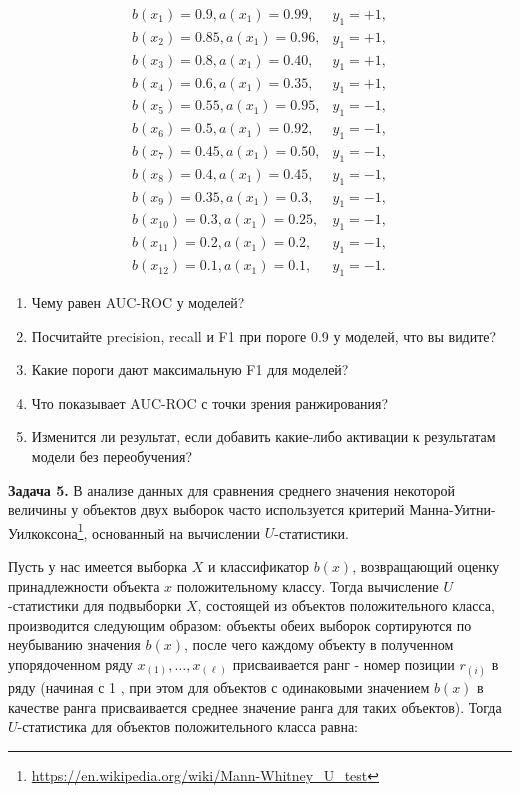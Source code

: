 \documentclass[12pt,fleqn]{article}
\begin{document}
$$
\begin{array}{lc}
b\left(x_{1}\right)=0.9, a\left(x_{1}\right)=0.99, & y_{1}=+1, \\
b\left(x_{2}\right)=0.85, a\left(x_{1}\right)=0.96, & y_{1}=+1, \\
b\left(x_{3}\right)=0.8, a\left(x_{1}\right)=0.40, & y_{1}=+1, \\b\left(x_{4}\right)=0.6, a\left(x_{1}\right)=0.35, & y_{1}=+1, \\b\left(x_{5}\right)=0.55, a\left(x_{1}\right)=0.95, & y_{1}=-1, \\
b\left(x_{6}\right)=0.5, a\left(x_{1}\right)=0.92, & y_{1}=-1, \\
b\left(x_{7}\right)=0.45, a\left(x_{1}\right)=0.50, & y_{1}=-1, \\b\left(x_{8}\right)=0.4, a\left(x_{1}\right)=0.45, & y_{1}=-1, \\
b\left(x_{9}\right)=0.35, a\left(x_{1}\right)=0.3, & y_{1}=-1, \\
b\left(x_{10}\right)=0.3, a\left(x_{1}\right)=0.25, & y_{1}=-1, \\
b\left(x_{11}\right)=0.2, a\left(x_{1}\right)=0.2, & y_{1}=-1, \\
b\left(x_{12}\right)=0.1, a\left(x_{1}\right)=0.1, & y_{1}=-1.
\end{array}
$$

\begin{enumerate}
    \item Чему равен AUC-ROC у моделей?
    \item Посчитайте precision, recall и F1 при пороге 0.9 у моделей, что вы видите?
    \item Какие пороги дают максимальную F1 для моделей? 
    \item Что показывает AUC-ROC с точки зрения ранжирования?
    \item Изменится ли результат, если добавить какие-либо активации к результатам модели без переобучения?
\end{enumerate}

\textbf{Задача 5.} В анализе данных для сравнения среднего значения некоторой величины у объектов двух выборок часто используется критерий Манна-Уитни-Уилкоксона\footnote{\href{https://en.wikipedia.org/wiki/Mann-Whitney_U_test}{https://en.wikipedia.org/wiki/Mann-Whitney\_U\_test}}, основанный на вычислении $U$-статистики.

Пусть у нас имеется выборка $X$ и классификатор $b(x)$, возвращающий оценку принадлежности объекта $x$ положительному классу. Тогда вычисление $U$-статистики для подвыборки $X$, состоящей из объектов положительного класса, производится следующим образом: объекты обеих выборок сортируются по неубыванию значения $b(x)$, после чего каждому объекту в полученном упорядоченном ряду $x_{(1)}, \ldots, x_{(\ell)}$ присваивается ранг - номер позиции $r_{(i)}$ в ряду (начиная с 1 , при этом для объектов с одинаковыми значением $b(x)$ в качестве ранга присваивается среднее значение ранга для таких объектов). Тогда $U$-статистика для объектов положительного класса равна:
\end{document}
